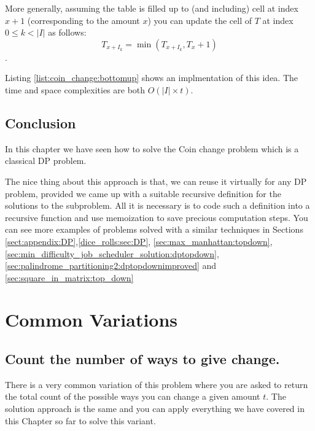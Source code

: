 More generally, assuming the table is filled up to (and including) cell at index $x+1$ (corresponding to the amount $x$)
you can update the cell of $T$ at index $0 \leq k < |I|$ as follows: $$T_{x+I_k} = \min (T_{x+I_k}, T_{x}+1)$$. 

Listing \ref{list:coin_change:bottomup} shows an implmentation of this idea. The time and space complexities are both $O(|I|\times t)$. 




\subsection{Conclusion}
In this chapter we have seen how to solve the Coin change problem which is a classical DP problem. 

The nice thing about this approach is that, we can reuse it virtually for any DP problem, provided we came up with a suitable recursive definition for the solutions to the subproblem.  All it is necessary is to code such a definition into a recursive function and use memoization to save precious computation steps. You can see more examples of problems solved with a similar techniques in Sections \ref{sect:appendix:DP},\ref{dice_rolls:sec:DP}, \ref{sec:max_manhattan:topdown}, \ref{sec:min_difficulty_job_scheduler_solution:dptopdown}, 
\ref{sec:palindrome_partitioning2:dptopdownimproved} and \ref{sec:square_in_matrix:top_down}

\section{Common Variations}

\subsection{Count the number of ways to give change.}
There is a very common variation of this problem where you are asked to return the total count of the possible ways you can change a given amount $t$. The solution approach
is the same and you can apply everything we have covered in this Chapter so far to solve this variant. 


